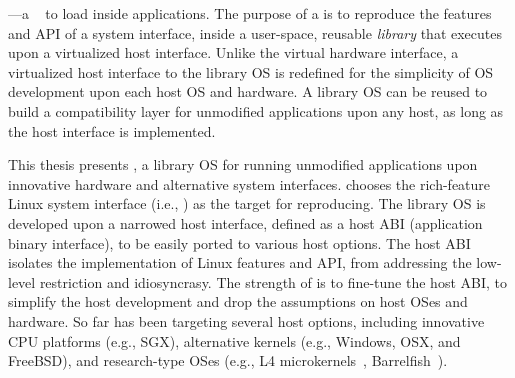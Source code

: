 ---a {\bf \libos{}}~\cite{porter11drawbridge,engler95exokernel,libra,unikernels}
to load inside applications.
The purpose of a \libos{} is to
reproduce the features and API of a system interface,
inside a user-space, reusable {\em library} that executes upon a virtualized host interface.
Unlike the virtual hardware interface,
a virtualized host interface to the library OS is redefined for the simplicity
of OS development upon each host OS and hardware.
A library OS can be reused to build a compatibility layer for unmodified applications upon any host,
as long as the host interface is implemented.


This thesis presents
{\bf \graphene{}},
a library OS for running unmodified applications upon innovative hardware and alternative system interfaces.
\graphene{} chooses the rich-feature Linux system interface (i.e., \linuxapis{})
as the target for reproducing.
The \graphene{} library OS
is developed upon a narrowed host interface, defined as a host ABI (application binary interface),
to be easily ported to various host options.
The host ABI isolates the implementation of Linux features and API, from addressing the low-level restriction and idiosyncrasy.
The strength of \graphene{} is to fine-tune the host ABI,
to simplify the host development and drop the assumptions on host OSes and hardware.
So far \graphene{}
has been targeting several host options,
including innovative CPU platforms (e.g., SGX), alternative kernels (e.g., Windows, OSX, and FreeBSD), and research-type OSes (e.g., L4 microkernels~\cite{l4family}, Barrelfish~\cite{baumann09barrelfish}).



